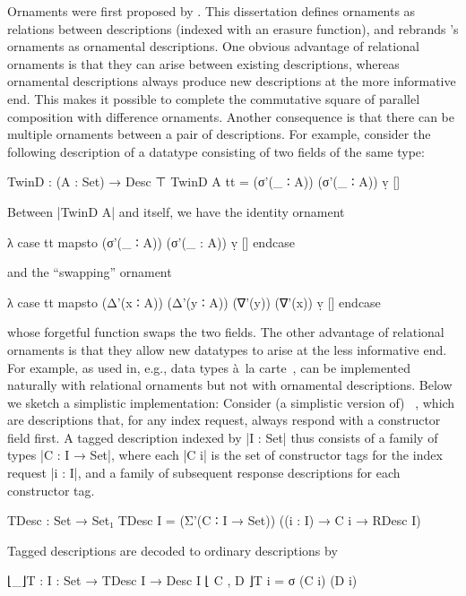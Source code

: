 Ornaments were first proposed by \citet{McBride-ornaments}.
This dissertation defines ornaments as relations between descriptions (indexed with an erasure function), and rebrands \citeauthor{McBride-ornaments}'s ornaments as ornamental descriptions.
One obvious advantage of relational ornaments is that they can arise between existing descriptions, whereas ornamental descriptions always produce new descriptions at the more informative end.
This makes it possible to complete the commutative square of parallel composition with difference ornaments.
Another consequence is that there can be multiple ornaments between a pair of descriptions.
For example, consider the following description of a datatype consisting of two fields of the same type:
\begin{code}
TwinD : (A : Set) → Desc ⊤
TwinD A tt = (σ'(_ ∶ A)) (σ'(_ ∶ A)) ṿ []
\end{code}
Between |TwinD A| and itself, we have the identity ornament
\begin{code}
λ case tt mapsto (σ'(_ ∶ A)) (σ'(_ : A)) ṿ [] endcase
\end{code}
and the ``swapping'' ornament
\begin{code}
λ case tt mapsto (Δ'(x ∶ A)) (Δ'(y ∶ A)) (∇'(y)) (∇'(x)) ṿ [] endcase
\end{code}
whose forgetful function swaps the two fields.
The other advantage of relational ornaments is that they allow new datatypes to arise at the less informative end.
For example,  as used in, e.g., data types à~la carte~\citep{Swierstra-data-types-a-la-carte}, can be implemented naturally with relational ornaments but not with ornamental descriptions.
Below we sketch a simplistic implementation: Consider (a simplistic version of) ~\citep{Chapman-levitation}, which are descriptions that, for any index request, always respond with a constructor field first.
A tagged description indexed by |I : Set| thus consists of a family of types |C : I → Set|, where each |C i| is the set of constructor tags for the index request |i : I|, and a family of subsequent response descriptions for each constructor tag.
\begin{code}
TDesc : Set → Set₁
TDesc I = (Σ'(C ∶ I → Set)) ((i : I) → C i → RDesc I)
\end{code}
Tagged descriptions are decoded to ordinary descriptions by
\begin{code}
⌊_⌋T : {I : Set} → TDesc I → Desc I
⌊ C , D ⌋T i = σ (C i) (D i)
\end{code}
